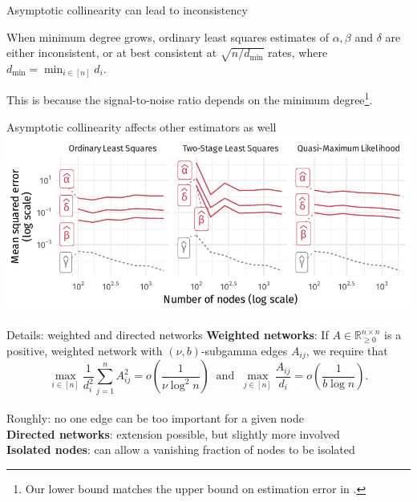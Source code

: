 \documentclass[aspectratio=169]{beamer}
\newcommand{\R}{\mathbb{R}}
\theoremstyle{remark}
\begin{document}
\begin{frame}{Asymptotic collinearity can lead to inconsistency}
    \begin{theorem}[Intuitive]
        When minimum degree grows, ordinary least squares estimates of $\alpha, \beta$ and $\delta$ are either inconsistent, or at best consistent at $\sqrt{n / d_{\min}}$ rates, where $d_{\min} = \min_{i \in [n]} d_i$.
    \end{theorem}
    
    This is because the \textcolor{BrickRed}{signal-to-noise ratio} depends on the minimum degree\footnote{Our lower bound matches the upper bound on estimation error in \cite{lee2004}.}.
\end{frame}

\begin{frame}{\textcolor{BrickRed}{Asymptotic collinearity} affects other estimators as well}
    \vspace{3mm}
    \centering
    \includegraphics{./figures/simulations/jobtalk-mse.pdf}
\end{frame}

\begin{frame}{Details: weighted and directed networks}
    \textbf{Weighted networks}: If $A \in \R^{n \times n}_{\ge 0}$ is a positive, weighted network with $(\nu, b)$-subgamma edges $A_{ij}$, we require that
    \begin{equation*}
        \max_{i \in [n]} \frac{1}{d_i^2} \sum_{j=1}^n A_{ij}^2
        = o\left( \frac{ 1 }{ \nu \log^2 n } \right)
        ~\text{ and }~
        \max_{j \in [n]} \frac{ A_{ij} }{ d_i }
        = o\left( \frac{ 1 }{ b \log n } \right).
    \end{equation*} \\
    Roughly: no one edge can be too important for a given node \\
    \vspace{4mm}
    \textbf{Directed networks}: extension possible, but slightly more involved \\
    \vspace{4mm}
    \textbf{Isolated nodes}: can allow a vanishing fraction of nodes to be isolated
\end{frame}
\end{document}
